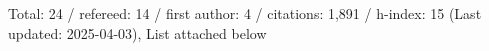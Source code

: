 Total: 24 / refereed: 14 / first author: 4 / citations: 1,891 / h-index: 15 (Last updated: 2025-04-03), List attached below